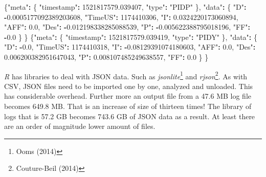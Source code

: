 \documentclass[12pt,oneside]{reedthesis}
\newenvironment{Shaded}{\begin{snugshade}}{\end{snugshade}}
\newcommand{\DecValTok}[1]{\textcolor[rgb]{0.00,0.00,0.81}{#1}}
\newcommand{\FloatTok}[1]{\textcolor[rgb]{0.00,0.00,0.81}{#1}}
\newcommand{\StringTok}[1]{\textcolor[rgb]{0.31,0.60,0.02}{#1}}
\newcommand{\OperatorTok}[1]{\textcolor[rgb]{0.81,0.36,0.00}{\textbf{#1}}}
\newcommand{\NormalTok}[1]{#1}
\theoremstyle{definition}
\theoremstyle{definition}
\theoremstyle{definition}
\theoremstyle{remark}
\begin{document}
\begin{Shaded}
\begin{Highlighting}[]
\NormalTok{\{}\StringTok{"meta"}\OperatorTok{:}\StringTok{ }\NormalTok{\{}
    \StringTok{"timestamp"}\OperatorTok{:}\StringTok{ }\FloatTok{1521817579.039407}\NormalTok{, }
    \StringTok{"type"}\OperatorTok{:}\StringTok{ "PIDP"}
\NormalTok{  \}, }
  \StringTok{"data"}\OperatorTok{:}\StringTok{ }\NormalTok{\{}
    \StringTok{"D"}\OperatorTok{:}\StringTok{ }\OperatorTok{-}\FloatTok{0.0005177092389203608}\NormalTok{, }
    \StringTok{"TimeUS"}\OperatorTok{:}\StringTok{ }\DecValTok{1174410306}\NormalTok{, }
    \StringTok{"I"}\OperatorTok{:}\StringTok{ }\FloatTok{0.0324220173060894}\NormalTok{, }
    \StringTok{"AFF"}\OperatorTok{:}\StringTok{ }\FloatTok{0.0}\NormalTok{, }
    \StringTok{"Des"}\OperatorTok{:}\StringTok{ }\OperatorTok{-}\FloatTok{0.012198338285088539}\NormalTok{, }
    \StringTok{"P"}\OperatorTok{:}\StringTok{ }\OperatorTok{-}\FloatTok{0.005622388795018196}\NormalTok{, }
    \StringTok{"FF"}\OperatorTok{:}\StringTok{ }\OperatorTok{-}\FloatTok{0.0}
\NormalTok{  \}}
\NormalTok{\}}
\NormalTok{\{}\StringTok{"meta"}\OperatorTok{:}\StringTok{ }\NormalTok{\{}
    \StringTok{"timestamp"}\OperatorTok{:}\StringTok{ }\FloatTok{1521817579.039419}\NormalTok{, }
    \StringTok{"type"}\OperatorTok{:}\StringTok{ "PIDY"}
\NormalTok{  \}, }
  \StringTok{"data"}\OperatorTok{:}\StringTok{ }\NormalTok{\{}
    \StringTok{"D"}\OperatorTok{:}\StringTok{ }\OperatorTok{-}\FloatTok{0.0}\NormalTok{, }
    \StringTok{"TimeUS"}\OperatorTok{:}\StringTok{ }\DecValTok{1174410318}\NormalTok{, }
    \StringTok{"I"}\OperatorTok{:}\StringTok{ }\OperatorTok{-}\FloatTok{0.08129391074180603}\NormalTok{, }
    \StringTok{"AFF"}\OperatorTok{:}\StringTok{ }\FloatTok{0.0}\NormalTok{, }
    \StringTok{"Des"}\OperatorTok{:}\StringTok{ }\FloatTok{0.006200382951647043}\NormalTok{, }
    \StringTok{"P"}\OperatorTok{:}\StringTok{ }\FloatTok{0.008107485249638557}\NormalTok{, }
    \StringTok{"FF"}\OperatorTok{:}\StringTok{ }\FloatTok{0.0}
\NormalTok{  \}}
\NormalTok{\}}
\end{Highlighting}
\end{Shaded}
\emph{R} has libraries to deal with JSON data. Such as
\emph{jsonlite}\footnote{Ooms (2014)} and \emph{rjson}\footnote{Couture-Beil
  (2014)}. As with CSV, JSON files need to be imported one by one,
analyzed and unloaded. This has considerable overhead. Further more an
output file from a 47.6 MB log file becomes 649.8 MB. That is an
increase of size of thirteen times! The library of logs that is 57.2 GB
becomes 743.6 GB of JSON data as a result. At least there are an order
of magnitude lower amount of files.
\end{document}
